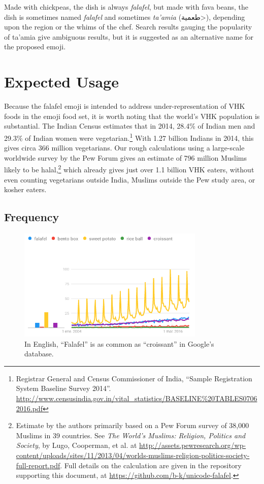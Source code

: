\documentclass[a4paper,10pt]{article}
\begin{document}
Made with chickpeas, the dish is always {\em falafel}, but made with fava beans, the dish
is sometimes named {\em falafel} and sometimes {\em ta'amia} (\<طعمية>), depending upon the
region or the whims of the chef. Search results gauging the popularity of {\sc ta'amia} give
ambiguous results, but it is suggested as an alternative name for the proposed emoji.

\section{Expected Usage}

Because the {\sc falafel} emoji is intended to address under-representation of VHK foods in the
emoji food set, it is worth noting that
the world's VHK population is substantial. The Indian Census estimates that
in 2014, 28.4\% of Indian men and 29.3\% of Indian women were
vegetarian.\footnote{Registrar General and Census Commissioner
of India, ``Sample Registration System Baseline Survey 2014''.
\url{http://www.censusindia.gov.in/vital_statistics/BASELINE\%20TABLES07062016.pdf}}
With 1.27 billion Indians in 2014, this gives circa 366 million vegetarians.
Our rough calculations using a large-scale worldwide survey by the Pew Forum gives an estimate
of 796 million Muslims likely to be halal,\footnote{
Estimate by the authors primarily based on a Pew Forum survey
of 38,000 Muslims in 39 countries.  See {\em The World's
Muslims: Religion, Politics and Society}, by Lugo, Cooperman, et al.  at
\url{http://assets.pewresearch.org/wp-content/uploads/sites/11/2013/04/worlds-muslims-religion-politics-society-full-report.pdf}.
Full details on the calculation are given in the repository supporting this document,
at \url{https://github.com/b-k/unicode-falafel}.
} which already gives just over 1.1 billion VHK eaters,
without even counting vegetarians outside India, Muslims outside the Pew study area, or
kosher eaters.


\subsection{Frequency}\label{freqsec}


\begin{figure}
\begin{center}
\includegraphics[width=3.5in]{trends.png}
\end{center}
\caption{In English, ``Falafel'' is as common as ``croissant'' in Google's database.}
\label{engplot}
\end{figure}
\end{document}
